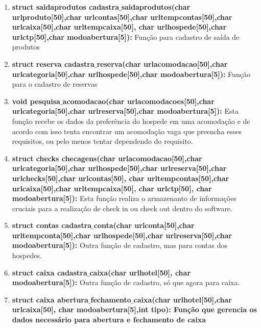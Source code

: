 \documentclass{article}
\begin{document}
\begin{enumerate}
	 \item \textbf{struct saidaprodutos cadastra$\_$saidaprodutos(char urlproduto[50],char urlcontas[50],char urltempcontas[50],char urlcaixa[50],char urltempcaixa[50],
	char urlhospede[50],char urlctp[50],char modoabertura[5]): }Função para cadastro de saída de produtos \\
	 \item \textbf{struct reserva cadastra$\_$reserva(char urlacomodacao[50],char urlcategoria[50],char urlhospede[50],char modoabertura[5]): }Função para o cadastro de reservas \\
	 \item \textbf{void pesquisa$\_$acomodacao(char urlacomodacoes[50],char urlcategoria[50],char urlreserva[50],char modoabertura[5]): }Esta função recebe os dados da preferência do hospede em uma acomodação e de acordo com isso tenta encontrar um acomodação vaga que preencha esses requisitos, ou pelo menos tentar dependendo do requisito.\\
	 \item \textbf{struct checks checagens(char urlacomodacao[50],char urlcategoria[50],char urlhospede[50],char urlreserva[50],char urlchecks[50],char urlcontas[50],
	char urltempcontas[50],char urlcaixa[50],char urltempcaixa[50], char urlctp[50], char modoabertura[5]): } Esta função realiza o armazenanto de informações cruciais para a realização de check in ou check out dentro do software.
	 \item \textbf{struct contas cadastra$\_$conta(char urlconta[50],char urltempconta[50],char urlhospede[50],char urlreserva[50],char modoabertura[5]): }Outra função de cadastro, mas para contas dos hospedes.\\ 
	 \item \textbf{struct caixa cadastra$\_$caixa(char urlhotel[50], char modoabertura[5]): }Outra função de cadastro, só que agora para caixa.\\ 
	 \item \textbf{struct caixa abertura$\_$fechamento$\_$caixa(char urlhotel[50],char urlcaixa[50], char modoabertura[5],int tipo): Função que gerencia os dados necessário para abertura e fechamento de caixa}
\end{enumerate}
\end{document}

